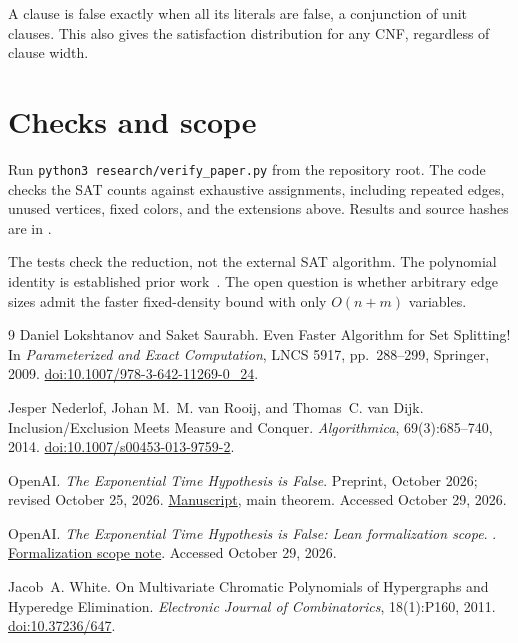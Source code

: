 \documentclass[11pt]{article}
\theoremstyle{definition}
\begin{document}
A clause is false exactly when all its literals are false, a conjunction
of unit clauses. This also gives the satisfaction distribution for any CNF,
regardless of clause width.

\section{Checks and scope}

Run \texttt{python3 research/verify\_paper.py} from the repository root.
The code checks the SAT counts against exhaustive assignments, including
repeated edges, unused vertices, fixed colors, and the extensions above.
Results and source hashes are in .

The tests check the reduction, not the external SAT algorithm.
The polynomial identity is established prior work~\cite{White11}.
The open question is whether arbitrary edge sizes admit the faster
fixed-density bound with only $O(n+m)$ variables.

\begin{thebibliography}{9}
Daniel Lokshtanov and Saket Saurabh.
\newblock Even Faster Algorithm for Set Splitting!
\newblock In \emph{Parameterized and Exact Computation}, LNCS 5917,
pp.~288--299, Springer, 2009.
\newblock \href{https://doi.org/10.1007/978-3-642-11269-0_24}{doi:10.1007/978-3-642-11269-0\_24}.

Jesper Nederlof, Johan M.~M. van Rooij, and Thomas~C. van Dijk.
\newblock Inclusion/Exclusion Meets Measure and Conquer.
\newblock \emph{Algorithmica}, 69(3):685--740, 2014.
\newblock \href{https://doi.org/10.1007/s00453-013-9759-2}{doi:10.1007/s00453-013-9759-2}.

OpenAI.
\newblock \emph{The Exponential Time Hypothesis is False}.
\newblock Preprint, October 2026; revised October 25, 2026.
\newblock \href{https://github.com/openai/math/blob/main/preprints/The-Exponential-Time-Hypothesis-is-False-October-25-2026/build/main_full_version.tex}{Manuscript}, main theorem. Accessed October 29, 2026.

OpenAI.
\newblock \emph{The Exponential Time Hypothesis is False: Lean formalization scope}.
.
\newblock \href{https://github.com/openai/math/blob/main/lean/docs/378.md}{Formalization scope note}.
Accessed October 29, 2026.

Jacob~A. White.
\newblock On Multivariate Chromatic Polynomials of Hypergraphs and Hyperedge Elimination.
\newblock \emph{Electronic Journal of Combinatorics}, 18(1):P160, 2011.
\newblock \href{https://doi.org/10.37236/647}{doi:10.37236/647}.
\end{thebibliography}
\end{document}
